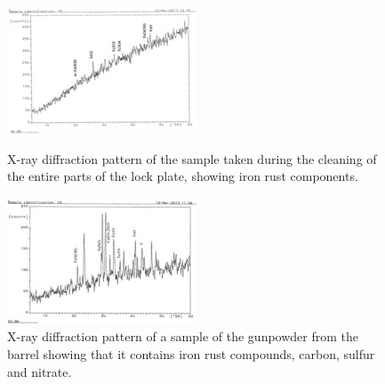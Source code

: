 \begin{figure}[!htb]
	\begin{minipage}[b]{0.5\linewidth}
		\centering
		\includegraphics[width=.9\linewidth]{figures/zidan_Fig6}
		\caption{X-ray diffraction pattern of the sample taken during the cleaning of the entire parts of the lock plate, showing iron rust components.}
		\label{fig:Fig6}
	\end{minipage} 
	\begin{minipage}[b]{0.5\linewidth}
		\centering
		\includegraphics[width=.9\linewidth]{figures/zidan_Fig7}
		\caption{X-ray diffraction pattern of a sample of the gunpowder from the barrel showing that it contains iron rust compounds, carbon, sulfur and nitrate.}
		\label{fig:Fig7}
	\end{minipage} 
\end{figure}

